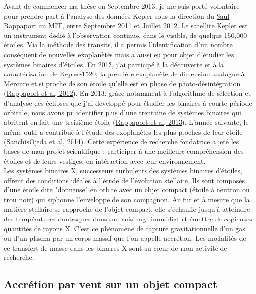 \documentclass[a4paper,12pt,onecolumn]{article}
\begin{document}
\indent \indent Avant de commencer ma thèse en Septembre 2013, je me suis porté volontaire pour prendre part à l'analyse des données Kepler sous la direction du \href{http://web.mit.edu/physics/people/faculty/rappaport_saul.html}{Saul Rappaport} au MIT, entre Septembre 2011 et Juillet 2012. Le satellite Kepler est un instrument dédié à l'observation continue, dans le visible, de quelque 150,000 étoiles. Via la méthode des transits, il a permis l'identification d'un nombre conséquent de nouvelles exoplanètes mais a aussi eu pour objet d'étudier les systèmes binaires d'étoiles. En 2012, j'ai participé à la découverte et à la caractérisation de \href{https://en.wikipedia.org/wiki/Kepler-1520}{Kepler-1520}, la première exoplanète de dimension analogue à Mercure et si proche de son étoile qu'elle est en phase de photo-désintégration (\href{https://arxiv.org/abs/1201.2662v2}{Rappaport et al, 2012}). En 2013, grâce notamment à l'algorithme de sélection et d'analyse des éclipses que j'ai développé pour étudier les binaires à courte période orbitale, nous avons pu identifier plus d'une trentaine de systèmes binaires qui abritent en fait une troisième étoile (\href{http://iopscience.iop.org/article/10.1088/0004-637X/768/1/33/meta}{Rappaport et al, 2013}). L'année suivante, le même outil a contribué à l'étude des exoplanètes les plus proches de leur étoile (\href{http://iopscience.iop.org/article/10.1088/0004-637X/787/1/47/meta}{SanchisOjeda et al, 2014}). Cette expérience de recherche fondatrice a jeté les bases de mon projet scientifique : participer à une meilleure compréhension des étoiles et de leurs vestiges, en intéraction avec leur environnement.\\
\indent Les systèmes binaires X, successeurs turbulents des systèmes binaires d'étoiles, offrent des conditions idéales à l'étude de l'évolution stellaire. Ils sont composés d'une étoile dite "donneuse" en orbite avec un objet compact (étoile à neutron ou trou noir) qui siphonne l'enveloppe de son compagnon. Au fur et à mesure que la matière stellaire se rapproche de l'objet compact, elle s'échauffe jusqu'à atteindre des températures dantesques dans son voisinage immédiat et émettre de copieuses quantités de rayons X. C'est ce phénomène de capture gravitationnelle d'un gas ou d'un plasma par un corps massif que l'on appelle accrétion. Les modalités de ce transfert de masse dans les binaires X sont au c\oe ur de mon activité de recherche. 

\subsection*{Accrétion par vent sur un objet compact}
\end{document}

